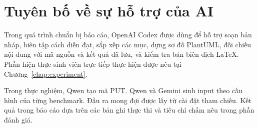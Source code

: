 \chapter*{Tuyên bố về sự hỗ trợ của AI}
{}

Trong quá trình chuẩn bị báo cáo, OpenAI Codex được dùng để hỗ trợ soạn bản nháp, biên tập cách diễn đạt, sắp xếp các mục, dựng sơ đồ PlantUML, đối chiếu nội dung với mã nguồn và kết quả đã lưu, và kiểm tra bản biên dịch LaTeX. Phần hiện thực sinh viên trực tiếp thực hiện được nêu tại Chương~\ref{chap:experiment}.

Trong thực nghiệm, Qwen tạo mã PUT. Qwen và Gemini sinh input theo cấu hình của từng benchmark. Đầu ra mong đợi được lấy từ cài đặt tham chiếu. Kết quả trong báo cáo dựa trên các bản ghi thực thi và tiêu chí chấm nêu trong phần đánh giá.
